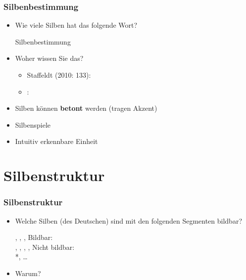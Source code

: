 \begin{frame}
\frametitle{Silbenbestimmung}

\begin{itemize}
	\item Wie viele Silben hat das folgende Wort?
	
	  \ea
          Silbenbestimmung
          \z
          
\pause	
	\item Woher wissen Sie das?
	
	\begin{itemize}
		\item Staffeldt (2010: 133):\\
		
		\item \citet[600]{Bussmann02a}:\\
		
	\end{itemize}

	\item Silben können \textbf{betont} werden (tragen Akzent)
	
	\item Silbenspiele
	
	\item Intuitiv erkennbare Einheit

\end{itemize}

\end{frame}



\section{Silbenstruktur}
%
\begin{frame}
\frametitle{Silbenstruktur}

\begin{itemize}
	\item Welche Silben (des Deutschen) sind mit den folgenden Segmenten bildbar?
	
	  \ea
          \textipa{[p]}, \textipa{[a]}, \textipa{[l]}, \textipa{[t]}
          \z
\pause	
\eal
\ex Bildbar:\\
	\textipa{[palt]}, \textipa{[alpt]}, \textipa{[lapt]}, \textipa{[talp]}, \textipa{[plat]}
\ex Nicht bildbar:\\
	*\textipa{[ltap]}, \dots\
\zl
\pause
	\item Warum?
\end{itemize}

\end{frame}



